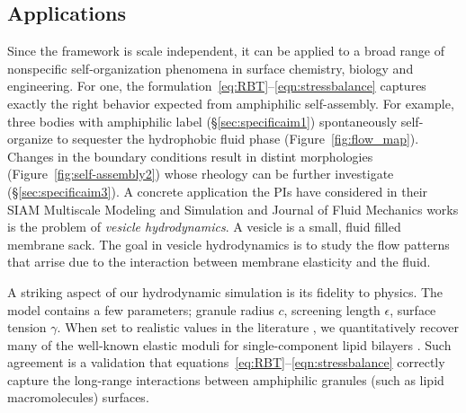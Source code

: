 \subsection{Applications}
Since the framework is scale independent, it can be applied to a broad range
of nonspecific self-organization phenomena in surface chemistry, biology
and engineering. For one, the
formulation~\eqref{eq:RBT}--\eqref{eqn:stressbalance} captures exactly
the right behavior expected from amphiphilic self-assembly. For example,
three bodies with amphiphilic label (\S\ref{sec:specificaim1})
spontaneously self-organize to sequester the hydrophobic fluid phase
(Figure~\ref{fig:flow_map}). Changes in the boundary conditions result
in distint morphologies (Figure~\ref{fig:self-assembly2}) whose rheology
can be further investigate (\S\ref{sec:specificaim3}).
%
A concrete application the PIs have considered in their
SIAM Multiscale Modeling and Simulation and Journal of Fluid Mechanics works
\cite{Fu2018_SIAM, FuQuRyYo22}
is the problem of \emph{vesicle hydrodynamics}.
A vesicle is a small, fluid filled membrane sack.
The goal in vesicle hydrodynamics is to study the flow patterns 
that arrise due to the interaction
between membrane elasticity and the fluid.

A striking aspect of our hydrodynamic
simulation is its fidelity to physics.
The model contains a few
parameters; granule radius $c$,
screening length $\epsilon$,
surface tension $\gamma$.
When set to realistic values in the literature
\cite{Fu2018_SIAM, ErLjCl89, Lin2005, Parsegian, Israelachvili80, GarciaSaez, KUZMIN2005, Petelska2012,Jackson2016},
we quantitatively recover many of the well-known
elastic moduli for single-component lipid bilayers
\cite{Nagle17, Nagle17-2, LeVeWa14,NAGLE2000159}. 
Such agreement is a validation that equations~\eqref{eq:RBT}--\eqref{eqn:stressbalance} 
correctly capture the long-range interactions between amphiphilic granules (such as lipid macromolecules) surfaces.

